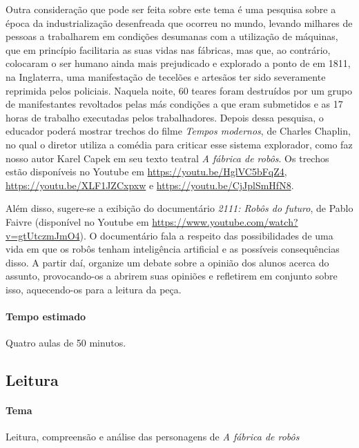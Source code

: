 \documentclass[11pt]{extarticle}
\begin{document}
Outra consideração que pode ser feita sobre este tema é uma pesquisa sobre a época da industrialização desenfreada que ocorreu no mundo, levando milhares de pessoas a trabalharem em condições desumanas com a utilização de máquinas, que em princípio facilitaria as suas vidas nas fábricas, mas que, ao contrário, colocaram o ser humano ainda mais prejudicado e explorado a ponto de em 1811, na Inglaterra, uma manifestação de tecelões e artesãos ter sido severamente reprimida pelos policiais. Naquela noite, 60 teares foram destruídos por um grupo de manifestantes revoltados pelas más condições a que eram submetidos e as 17 horas de trabalho executadas pelos trabalhadores. Depois dessa pesquisa, o educador poderá mostrar trechos do filme \textit{Tempos modernos}, de Charles Chaplin, no qual o diretor utiliza a comédia para criticar esse sistema explorador, como faz nosso autor Karel Capek em seu texto teatral \textit{A fábrica de robôs}. Os trechos estão disponíveis no Youtube em \url{https://youtu.be/HglVC5bFqZ4}, \url{https://youtu.be/XLF1JZCxpxw} e \url{https://youtu.be/CjJplSmHfN8}. 


Além disso, sugere-se a exibição do documentário \textit{2111: Robôs do futuro}, de Pablo Faivre (disponível no Youtube em \url{https://www.youtube.com/watch?v=gtUtczmJmO4}). O documentário fala a respeito das possibilidades de uma vida em que os robôs tenham inteligência artificial e as possíveis consequências disso. A partir daí, organize um debate sobre a opinião dos alunos acerca do assunto, provocando-os a abrirem suas opiniões e refletirem em conjunto sobre isso, aquecendo-os para a leitura da peça.

\paragraph{Tempo estimado} Quatro aulas de 50 minutos. 

\subsection{Leitura}

\paragraph{Tema} Leitura, compreensão e análise das personagens de \textit{A fábrica de robôs}
\end{document}
